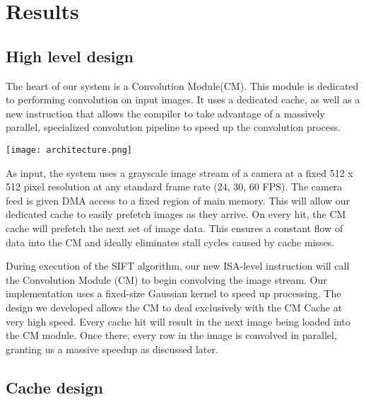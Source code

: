 \section{Results}

\subsection{High level design}
The heart of our system is a Convolution Module(CM).  This module is dedicated to performing convolution on input images.  It uses a dedicated cache, as well as a new instruction that allows the compiler to take advantage of a massively parallel, specialized convolution pipeline to speed up the convolution process.

\begin{center}
\texttt{[image: architecture.png]}%
\label{fig:architecture}%
\end{center}

As input, the system uses a grayscale image stream of a camera at a fixed 512 x 512 pixel resolution at any standard frame rate (24, 30, 60 FPS). The camera feed is given DMA access to a fixed region of main memory. This will allow our dedicated cache to easily prefetch images as they arrive. On every hit, the CM cache will prefetch the next set of image data. This ensures a constant flow of data into the CM and ideally eliminates stall cycles caused by cache misses.  

During execution of the SIFT algorithm, our new ISA-level instruction will call the Convolution Module (CM) to begin convolving the image stream. Our implementation uses a fixed-size Gaussian kernel to speed up processing.  The design we developed  allows the CM to deal exclusively with the CM Cache at very high speed. Every cache hit will result in the next image being loaded into the CM module. Once there, every row in the image is convolved in parallel, granting us a massive speedup as discussed later.


\subsection{Cache design}
